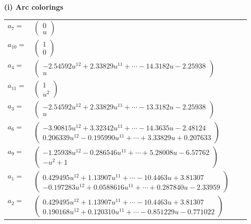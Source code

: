 \documentclass[1p]{elsarticle_modified}
\theoremstyle{definition}
\begin{document}
\flushleft \textbf{(i) Arc colorings}\\
\begin{tabular}{m{7pt} m{180pt} m{7pt} m{180pt} }
\flushright $a_{7}=$&$\begin{pmatrix}0\\u\end{pmatrix}$ \\
\flushright $a_{10}=$&$\begin{pmatrix}1\\0\end{pmatrix}$ \\
\flushright $a_{4}=$&$\begin{pmatrix}-2.54592 u^{12}+2.33829 u^{11}+\cdots-14.3182 u-2.25938\\u\end{pmatrix}$ \\
\flushright $a_{11}=$&$\begin{pmatrix}1\\u^2\end{pmatrix}$ \\
\flushright $a_{3}=$&$\begin{pmatrix}-2.54592 u^{12}+2.33829 u^{11}+\cdots-13.3182 u-2.25938\\u\end{pmatrix}$ \\
\flushright $a_{6}=$&$\begin{pmatrix}-3.90815 u^{12}+3.32342 u^{11}+\cdots-14.3635 u-2.48124\\0.206339 u^{12}-0.195990 u^{11}+\cdots+3.33829 u+0.207633\end{pmatrix}$ \\
\flushright $a_{9}=$&$\begin{pmatrix}-1.25938 u^{12}-0.286546 u^{11}+\cdots+5.28008 u-6.57762\\- u^2+1\end{pmatrix}$ \\
\flushright $a_{1}=$&$\begin{pmatrix}0.429495 u^{12}+1.13907 u^{11}+\cdots-10.4463 u+3.81307\\-0.197283 u^{12}+0.0588616 u^{11}+\cdots+0.287840 u-2.33959\end{pmatrix}$ \\
\flushright $a_{2}=$&$\begin{pmatrix}0.429495 u^{12}+1.13907 u^{11}+\cdots-10.4463 u+3.81307\\0.190168 u^{12}+0.120310 u^{11}+\cdots-0.851229 u-0.771022\end{pmatrix}$ \\

\end{tabular}
\end{document}

